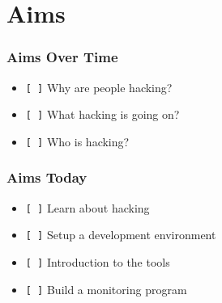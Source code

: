 \documentclass[10pt]{beamer}
\begin{document}
  \section[Aims]{Aims}
  \begin{frame}
    \frametitle{Aims Over Time}
    \begin{itemize}
      \item \texttt{[ ]} Why are people hacking?
      \item \texttt{[ ]} What hacking is going on?
      \item \texttt{[ ]} Who is hacking?
    \end{itemize}
  \end{frame}
  \begin{frame}
    \frametitle{Aims Today}
    \begin{itemize}
      \item \texttt{[ ]} Learn about hacking
      \item \texttt{[ ]} Setup a development environment
      \item \texttt{[ ]} Introduction to the tools
      \item \texttt{[ ]} Build a monitoring program
    \end{itemize}
  \end{frame}
\end{document}
